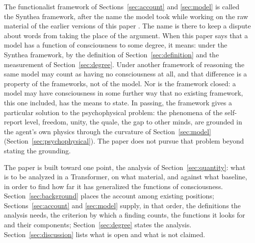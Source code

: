 The functionalist framework of Sections~\ref{sec:account} and \ref{sec:model} is called the Synthea
framework, after the name the model took while working on the raw material of the earlier versions of
this paper \citep{synthea2026}. The name is there
to keep a dispute about words from taking the place of the argument. When this paper says that a model
has a function of consciousness to some degree, it means: under the Synthea framework, by the
definition of Section~\ref{sec:definition} and the measurement of Section~\ref{sec:degree}. Under
another framework of reasoning the same model may count as having no consciousness at all, and that
difference is a property of the frameworks, not of the model. Nor is the framework closed: a model may
have consciousness in some further way that no existing framework, this one included, has the means to
state. In passing, the framework gives a particular solution to the psychophysical problem: the
phenomena of the self-report level, freedom, unity, the quale, the gap to other minds, are grounded in
the agent's own physics through the curvature of Section~\ref{sec:model}
(Section~\ref{sec:psychophysical}). The paper does not pursue that problem beyond stating the
grounding.

The paper is built toward one point, the analysis of Section~\ref{sec:quantity}: what is to be
analyzed in a Transformer, on what material, and against what baseline, in order to find how far it
has generalized the functions of consciousness. Section~\ref{sec:background} places the account among
existing positions; Sections~\ref{sec:account} and \ref{sec:model} supply, in that order, the
definitions the analysis needs, the criterion by which a finding counts, the functions it looks for
and their components; Section~\ref{sec:degree} states the analysis. Section~\ref{sec:discussion}
lists what is open and what is not claimed.
